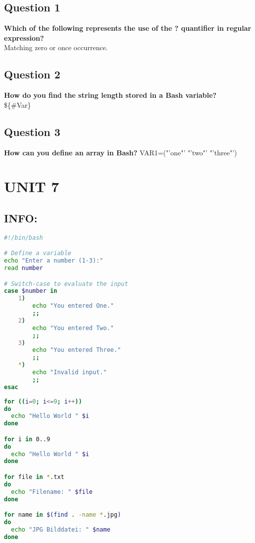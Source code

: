 \documentclass[11pt,parskip]{scrartcl}
\begin{document}
\subsection*{Question 1}
\textbf{Which of the following represents the use of the ? quantifier in regular expression?} \\
Matching zero or once occurrence.

\subsection*{Question 2}
\textbf{How do you find the string length stored in a Bash variable?} \\
\$\{\#Var\}

\subsection*{Question 3}
\textbf{How can you define an array in Bash?}
VAR1=("'one"' "'two"' "'three"')

\section*{UNIT 7}

\subsection*{INFO:}

\begin{lstlisting}[language=bash, basicstyle=\ttfamily, frame=single]
#!/bin/bash

# Define a variable
echo "Enter a number (1-3):"
read number

# Switch-case to evaluate the input
case $number in
    1)
        echo "You entered One."
        ;;
    2)
        echo "You entered Two."
        ;;
    3)
        echo "You entered Three."
        ;;
    *)
        echo "Invalid input."
        ;;
esac
\end{lstlisting}


\begin{lstlisting}[language=bash]
for ((i=0; i<=9; i++))
do
  echo "Hello World " $i
done

for i in 0..9
do
  echo "Hello World " $i
done

for file in *.txt
do
  echo "Filename: " $file
done

for name in $(find . -name *.jpg)
do
  echo "JPG Bilddatei: " $name
done
\end{lstlisting}
\end{document}
